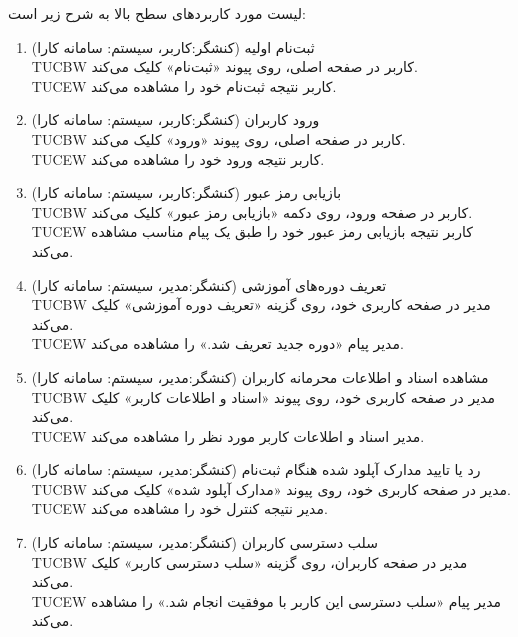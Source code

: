 \documentclass[12pt]{article}
\begin{document}
	لیست مورد کاربردهای سطح بالا به شرح زیر است:
	\begin{enumerate}
		\item
		ثبت‌نام اولیه (کنشگر:‌کاربر، سیستم: سامانه کارا)\\
		TUCBW کاربر در صفحه اصلی، روی پیوند «ثبت‌نام» کلیک می‌کند.\\
		TUCEW کاربر نتیجه ثبت‌نام خود را مشاهده می‌کند.\\

		\item
		ورود کاربران (کنشگر:‌کاربر، سیستم: سامانه کارا)\\
		TUCBW کاربر در صفحه اصلی، روی پیوند «ورود» کلیک می‌کند. \\
		TUCEW کاربر نتیجه ورود خود را مشاهده می‌کند.\\

		\item
		بازیابی رمز عبور (کنشگر:‌کاربر، سیستم: سامانه کارا)\\
		TUCBW کاربر در صفحه ورود، روی دکمه «بازیابی رمز عبور» کلیک می‌کند.\\
		TUCEW کاربر نتیجه بازیابی رمز عبور خود را طبق یک پیام مناسب مشاهده می‌کند.\\

		\item
		تعریف دوره‌های آموزشی (کنشگر:‌مدیر، سیستم: سامانه کارا)\\
		TUCBW  مدیر در صفحه کاربری خود، روی گزینه «تعریف دوره آموزشی» کلیک می‌کند.\\
		TUCEW مدیر پیام «دوره جدید تعریف شد.» را مشاهده می‌کند.\\

		\item
		مشاهده اسناد و اطلاعات محرمانه کاربران (کنشگر:‌مدیر، سیستم: سامانه کارا)\\
		TUCBW مدیر در صفحه کاربری خود، روی پیوند «اسناد و اطلاعات کاربر» کلیک می‌کند.\\
		TUCEW مدیر اسناد و اطلاعات کاربر مورد نظر را مشاهده می‌کند.\\

		\item
		رد یا تایید مدارک آپلود شده هنگام ثبت‌نام (کنشگر:‌مدیر، سیستم: سامانه کارا)\\
		TUCBW مدیر در صفحه کاربری خود، روی پیوند «مدارک آپلود شده» کلیک می‌کند.\\
		TUCEW مدیر نتیجه کنترل خود را مشاهده می‌کند.\\

		\item
		سلب دسترسی کاربران (کنشگر:‌مدیر، سیستم: سامانه کارا)\\
		TUCBW مدیر در صفحه کاربران، روی گزینه «سلب دسترسی کاربر» کلیک می‌کند.\\
		TUCEW مدیر پیام «سلب دسترسی این کاربر با موفقیت انجام شد.» را مشاهده می‌کند.\\


\end{enumerate}
\end{document}
